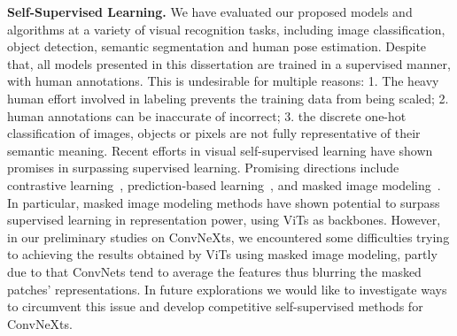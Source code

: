 \documentclass{ucbthesis}
\renewcommand{\paragraph}[1]{\vspace{1.25mm}\noindent\textbf{#1}}
\begin{document}
\paragraph{Self-Supervised Learning.}
We have evaluated our proposed models and algorithms at a variety of visual recognition tasks, including image classification, object detection, semantic segmentation and human pose estimation. Despite that, all models presented in this dissertation are trained in a supervised manner, with human annotations. This is undesirable for multiple reasons: 1. The heavy human effort involved in labeling prevents the training data from being scaled; 2. human annotations can be inaccurate of incorrect; 3. the discrete one-hot classification of images, objects or pixels are not fully representative of their semantic meaning. Recent efforts in visual self-supervised learning have shown promises in surpassing supervised learning. Promising directions include contrastive learning~\cite{He2020,}, prediction-based learning~\cite{Grill2020,Caron2021}, and masked image modeling~\cite{Bao2021,he2021masked}. In particular, masked image modeling methods have shown potential to surpass supervised learning in representation power, using ViTs as backbones. However, in our preliminary studies on ConvNeXts, we encountered some difficulties trying to achieving the results obtained by ViTs using masked image modeling, partly due to that ConvNets tend to average the features thus blurring the masked patches' representations. In future explorations we would like to investigate ways to circumvent this issue and develop competitive self-supervised methods for ConvNeXts.









\printbibliography
\end{document}
